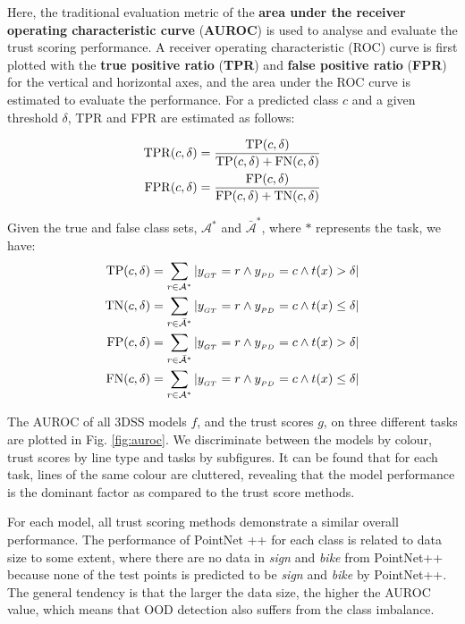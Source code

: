\documentclass[journal]{IEEEtran}
\begin{document}
Here, the traditional evaluation metric of the \textbf{area under the receiver operating characteristic curve} (\textbf{AUROC}) is used to analyse and evaluate the trust scoring performance.
A receiver operating characteristic (ROC) curve is first plotted with the \textbf{true positive ratio} (\textbf{TPR}) and \textbf{false positive ratio} (\textbf{FPR}) for the vertical and horizontal axes, and the area under the ROC curve is estimated to evaluate the performance. For a predicted class $c$ and a given threshold $\delta$, TPR and FPR are estimated as follows:

\begin{eqnarray}
{\rm TPR}(c,\delta) = \frac{{\rm TP}(c,\delta)}{{\rm TP}(c,\delta)+{\rm FN}(c,\delta)}\\
{\rm FPR}(c,\delta) = \frac{{\rm FP}(c,\delta)}{{\rm FP}(c,\delta)+{\rm TN}(c,\delta)}
\end{eqnarray}

Given the true and false class sets, $\mathcal{A}^*$ and $\mathcal{\bar{A}}^*$, where $*$ represents the task, we have:
\begin{eqnarray}
{\rm TP}(c,\delta) = \sum_{r\in \mathcal{A}^*} { |y_{_{GT}}=r \land y_{_{PD}}=c \land t(x) > \delta|}\\
{\rm TN}(c,\delta) = \sum_{r\in \mathcal{\bar{A}}^*} {|y_{_{GT}}=r \land y_{_{PD}}=c \land t(x) \le \delta|}\\
{\rm FP}(c,\delta) = \sum_{r\in \mathcal{\bar{A}}^*} { |y_{_{GT}}=r \land y_{_{PD}}=c \land t(x) > \delta|} \label{eq:fp}\\
{\rm FN}(c,\delta) = \sum_{r\in \mathcal{A}^*} {|y_{_{GT}}=r \land y_{_{PD}}=c \land t(x) \le \delta|} 
\end{eqnarray}

The AUROC of all 3DSS models $f$, and the trust scores $g$, on three different tasks are plotted in Fig. \ref{fig:auroc}. We discriminate between the models by colour, trust scores by line type and tasks by subfigures.
It can be found that for each task, lines of the same colour are cluttered, revealing that the model performance is the dominant factor as compared to the trust score methods.

For each model, all trust scoring methods demonstrate a similar overall performance.
The performance of PointNet ++ for each class is related to data size to some extent, where there are no data in \textit{sign} and \textit{bike} from PointNet++ because none of the test points is predicted to be \textit{sign} and \textit{bike} by PointNet++.
The general tendency is that the larger the data size, the higher the AUROC value, which means that OOD detection also suffers from the class imbalance.
\end{document}
